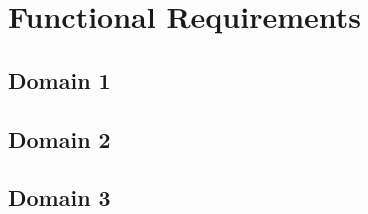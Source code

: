 \section{Functional Requirements}




\subsection{Domain 1}



\subsection{Domain 2}



\subsection{Domain 3}




%
%
